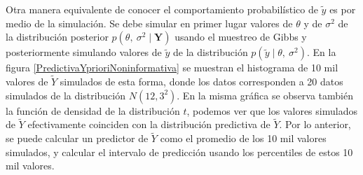 \documentclass[
  10pt,
  spanish,
]{book}
\theoremstyle{definition}
\theoremstyle{definition}
\theoremstyle{definition}
\theoremstyle{definition}
\theoremstyle{remark}
\begin{document}
Otra manera equivalente de conocer el comportamiento probabilístico de \(\tilde{y}\) es por medio de la simulación. Se debe simular en primer lugar valores de \(\theta\) y de \(\sigma^2\) de la distribución posterior \(p(\theta,\ \sigma^2\mid\mathbf{Y})\) usando el muestreo de Gibbs y posteriormente simulando valores de \(\tilde{y}\) de la distribución \(p(\tilde{y}\mid\theta,\ \sigma^2)\). En la figura \ref{PredictivaYprioriNoninformativa} se muestran el histograma de 10 mil valores de \(\tilde{Y}\) simulados de esta forma, donde los datos corresponden a 20 datos simulados de la distribución \(N(12, 3^2)\). En la misma gráfica se observa también la función de densidad de la distribución \(t\), podemos ver que los valores simulados de \(\tilde{Y}\) efectivamente coinciden con la distribución predictiva de \(\tilde{Y}\). Por lo anterior, se puede calcular un predictor de \(\tilde{Y}\) como el promedio de los 10 mil valores simulados, y calcular el intervalo de predicción usando los percentiles de estos 10 mil valores.
\end{document}
